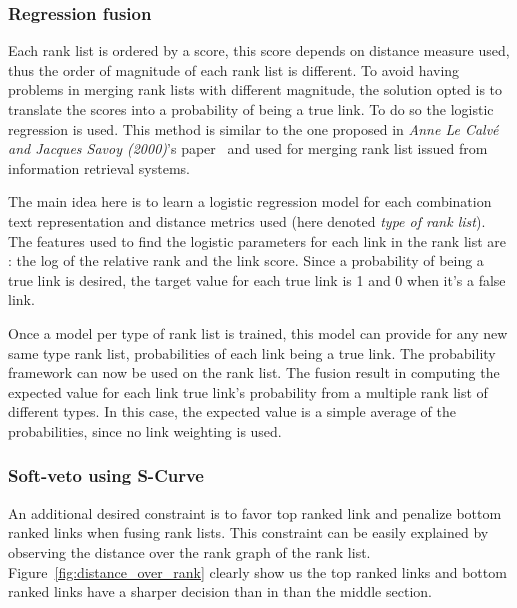 \subsubsection{Regression fusion}

Each rank list is ordered by a score, this score depends on distance measure used, thus the order of magnitude of each rank list is different.
To avoid having problems in merging rank lists with different magnitude, the solution opted is to translate the scores into a probability of being a true link.
To do so the logistic regression is used.
This method is similar to the one proposed in \textit{Anne Le Calvé and Jacques Savoy (2000)}'s paper~\cite{le_calve_database_merging} and used for merging rank list issued from information retrieval systems.

The main idea here is to learn a logistic regression model for each combination text representation and distance metrics used (here denoted \textit{type of rank list}).
The features used to find the logistic parameters for each link in the rank list are : the log of the relative rank and the link score.
Since a probability of being a true link is desired, the target value for each true link is 1 and 0 when it's a false link.

Once a model per type of rank list is trained, this model can provide for any new same type rank list, probabilities of each link being a true link.
The probability framework can now be used on the rank list.
The fusion result in computing the expected value for each link true link's probability from a multiple rank list of different types.
In this case, the expected value is a simple average of the probabilities, since no link weighting is used.

\subsubsection{Soft-veto using S-Curve}

An additional desired constraint is to favor top ranked link and penalize bottom ranked links when fusing rank lists.
This constraint can be easily explained by observing the distance over the rank graph of the rank list.
Figure~\ref{fig:distance_over_rank} clearly show us the top ranked links and bottom ranked links have a sharper decision than in than the middle section.

